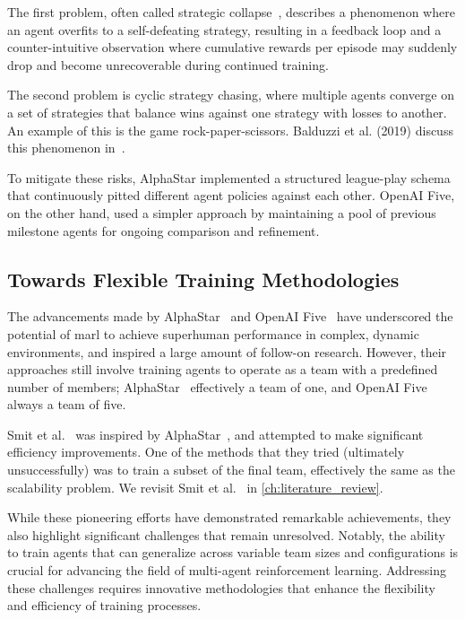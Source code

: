 The first problem, often called strategic 
collapse~\cite{berner2019,vinyals2019}, describes a phenomenon 
where an agent overfits to a self-defeating strategy, 
resulting in a feedback loop and a counter-intuitive observation where 
cumulative rewards per episode may suddenly drop and become unrecoverable 
during continued training.

The second problem is cyclic strategy chasing, where multiple agents 
converge on a set of strategies that balance wins against one strategy 
with losses to another. An example of this is the game rock-paper-scissors. 
Balduzzi et al. (2019) discuss this phenomenon in~\cite{balduzzi2019}.

To mitigate these risks, AlphaStar implemented a structured league-play 
schema that continuously pitted different agent policies against each other. 
OpenAI Five, on the other hand, used a simpler approach by maintaining a pool
of previous milestone agents for ongoing comparison and refinement.

    \subsection*{Towards Flexible Training Methodologies}

The advancements made by AlphaStar~\cite{vinyals2019} and 
OpenAI Five~\cite{berner2019} have underscored the potential of \gls{marl}
to achieve superhuman performance in complex, dynamic environments,
and inspired a large amount of follow-on research.
However, their approaches still involve training agents to 
operate as a team with a predefined number of members;
AlphaStar~\cite{vinyals2019} effectively a team of one,
and OpenAI Five~\cite{berner2019} always a team of five.

Smit et al.~\cite{smit2023} was inspired by AlphaStar~\cite{vinyals2019},
and attempted to make significant efficiency improvements.
One of the methods that they tried (ultimately unsuccessfully) was to train a 
subset of the final team, effectively the same as the scalability problem.
We revisit Smit et al.~\cite{smit2023} in \cref{ch:literature_review}.

While these pioneering efforts have demonstrated remarkable achievements, 
they also highlight significant challenges that remain unresolved. 
Notably, the ability to train agents that can generalize across variable 
team sizes and configurations is crucial for advancing the field of 
multi-agent reinforcement learning. Addressing these challenges requires 
innovative methodologies that enhance the flexibility and efficiency of 
training processes. 

